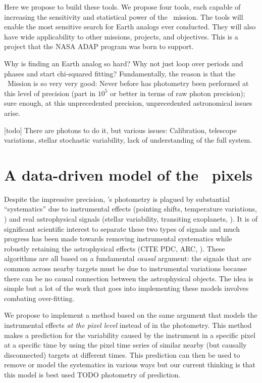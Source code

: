 \documentclass[letterpaper,12pt,preprint]{hack_aastex}
\begin{document}
Here we propose to build these tools.
We propose four tools, each capable of increasing the sensitivity and
statistical power of the \Kepler\ mission.
The tools will enable the most sensitive search for Earth analogs ever
conducted.
They will also have wide applicability to other missions, projects, and
objectives.
This is a project that the NASA ADAP program was born to support.

Why is finding an Earth analog so hard?
Why not just loop over periods and phases and start chi-squared fitting?
Fundamentally, the reason is that the \Kepler\ Mission is so very very good:
Never before has photometry been performed at this level of precision (part
in $10^{5}$ or better in terms of raw photon precision);
sure enough, at this unprecedented precision, unprecedented astronomical
issues arise.


[todo] There are photons to do it, but various issues:  Calibration, telescope variations, stellar stochastic variability, lack of understanding of the full system.

\section{A data-driven model of the \Kepler\ pixels}

Despite the impressive precision, \Kepler's photometry is plagued by
substantial ``systematics'' due to instrumental effects (pointing shifts,
temperature variations, \etc) and real astrophysical signals (stellar
variability, transiting exoplanets, \etc).
It is of significant scientific interest to separate these two types of
signals and much progress has been made towards removing instrumental
systematics while robustly retaining the astrophysical effects (CITE PDC, ARC,
\etc).
These algorithms are all based on a fundamental \emph{causal} argument: the
signals that are common across nearby targets must be due to instrumental
variations because there can be no causal connection between the astrophysical
objects.
The idea is simple but a lot of the work that goes into implementing these
models involves combating over-fitting.

We propose to implement a method based on the same argument that models the
instrumental effects \emph{at the pixel level} instead of in the photometry.
This method makes a prediction for the variability caused by the instrument in
a specific pixel at a specific time by using the pixel time series of similar
nearby (but causally disconnected) targets at different times.
This prediction can then be used to remove or model the systematics in various
ways but our current thinking is that this model is best used TODO photometry
of prediction.
\end{document}
